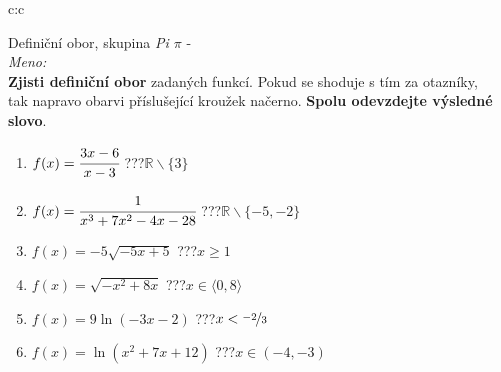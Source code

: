 \documentclass[10pt]{report}
\begin{document}
\newpage
\thispagestyle{empty}
\begin{tabular}{c:c}
\begin{minipage}[c][99mm][t]{0.49\linewidth}
\begin{center}
\vspace{7mm}
{\huge Definiční obor, skupina \textit{Pi $\pi$} -}\\[4.5mm]
\textit{Meno:}\phantom{xxxxxxxxxxxxxxxxxxxxxxxxxxxxxxxxxxxxxxxxxxxxxxxxxxxxxxxxxxxxxxxxx}\\[3.5mm]
\textbf{Zjisti definiční obor} zadaných funkcí. Pokud se shoduje s tím za otazníky,\\tak napravo obarvi příslušející kroužek načerno. \textbf{Spolu odevzdejte výsledné slovo}.\\[3mm]
\begin{minipage}{0.77\linewidth}
\begin{center}
\begin{varwidth}{\textwidth}
\begin{enumerate}
\normalsize
\item $f(x)=\cfrac{3x-6}{x-3}$\quad \dotfill\; ???\;\dotfill \quad $\mathbb{R}\smallsetminus\{3\}$
\item $f(x)=\cfrac{1}{x^3+7x^2-4x-28}$\quad \dotfill\; ???\;\dotfill \quad $\mathbb{R}\smallsetminus\{-5,-2\}$
\item $f(x)=-5\sqrt{-5x+5}$\quad \dotfill\; ???\;\dotfill \quad $x\geq1$
\item $f(x)=\sqrt{-x^2+8x}$\quad \dotfill\; ???\;\dotfill \quad $x\in\langle0 , 8\rangle$
\item $f(x)=9\ln{(-3x-2)}$\quad \dotfill\; ???\;\dotfill \quad $x<\nicefrac{-2}{3}$
\item $f(x)=\ln{(x^2+7x+12)}$\quad \dotfill\; ???\;\dotfill \quad $x\in(-4 , -3)$
\end{enumerate}
\end{varwidth}
\end{center}
\end{minipage}
\begin{minipage}{0.20\linewidth}

\end{minipage}
\end{center}
\end{minipage}
\end{tabular}
\end{document}
